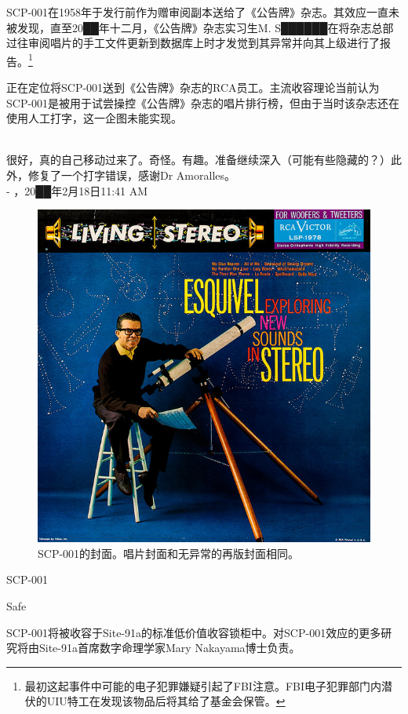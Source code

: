 SCP-001在1958年于发行前作为赠审阅副本送给了《公告牌》杂志。其效应一直未被发现，直至20██年十二月，《公告牌》杂志实习生M. S██████在将杂志总部过往审阅唱片的手工文件更新到数据库上时才发觉到其异常并向其上级进行了报告。\footnote{最初这起事件中可能的电子犯罪嫌疑引起了FBI注意。FBI电子犯罪部门内潜伏的UIU特工在发现该物品后将其给了基金会保管。\label{footnote 3}}

正在定位将SCP-001送到《公告牌》杂志的RCA员工。主流收容理论当前认为SCP-001是被用于试尝操控《公告牌》杂志的唱片排行榜，但由于当时该杂志还在使用人工打字，这一企图未能实现。


\newpage



\begin{scpbox}
 \\
很好，真的自己移动过来了。奇怪。有趣。准备继续深入（可能有些隐藏的？）此外，修复了一个打字错误，感谢Dr Amoralles。 \\
- ，20██年2月18日11:41 AM
\end{scpbox}

\begin{figure}[H]
	\centering
	\includegraphics[width=0.5\linewidth]{images/SCP.001.a.record.2.jpg}
	\caption*{SCP-001的封面。唱片封面和无异常的再版封面相同。}
\end{figure}

SCP-001

Safe

SCP-001将被收容于Site-91a的标准低价值收容锁柜中。对SCP-001效应的更多研究将由Site-91a首席数字命理学家Mary Nakayama博士负责。

